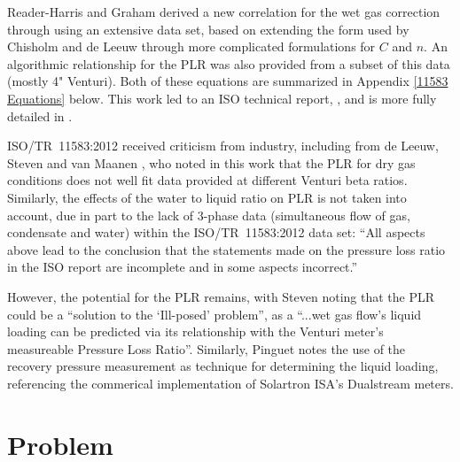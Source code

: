\documentclass[journal]{IEEEtran}
\begin{document}
Reader-Harris and Graham \cite{Reader-Harris2009} derived a new correlation for the wet gas correction through using an extensive data set, based on extending the form used by Chisholm \cite{Chisholm1977} and de Leeuw \cite{DeLeeuw1997} through more complicated formulations for $C$ and $n$.  An algorithmic relationship for the \acrshort{PLR} was also provided from a subset of this data (mostly 4" Venturi).  Both of these equations are summarized in Appendix \ref{11583 Equations} below. This work led to an ISO technical report, \cite{ISOTubes}, and is more fully detailed in \cite{Reader-Harris2015}.  

ISO/TR~11583:2012 received criticism from industry, including from de Leeuw, Steven and van Maanen \cite{DeLeeuw2011}, who noted in this work that the \acrlong{PLR} for dry gas conditions does not well fit data provided at different Venturi beta ratios.  Similarly, the effects of the water to liquid ratio on  \acrshort{PLR} is not taken into account, due in part to the lack of 3-phase data (simultaneous flow of gas, condensate and water) within the ISO/TR~11583:2012 data set: ``All aspects above lead to the conclusion that the statements made on the pressure loss ratio in the ISO report are incomplete and in some aspects incorrect.'' 

However, the potential for the \acrlong{PLR} remains, with Steven \cite{Steven2018OrificeProblem} noting that the \acrshort{PLR} could be a ``solution to the `Ill-posed' problem'', as a ``...wet gas flow’s liquid loading can be predicted via its relationship with the Venturi meter’s measureable Pressure Loss Ratio''.  Similarly, Pinguet \cite{Pinguet2018ExtensiveConditions} notes the use of the recovery pressure measurement as technique for determining the liquid loading, referencing the commerical implementation of Solartron ISA's Dualstream meters.



\section{Problem}

\end{document}
